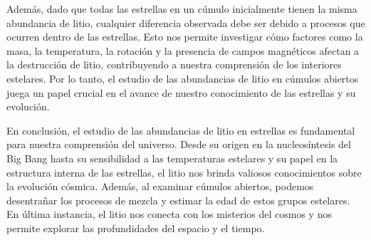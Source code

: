 Además, dado que todas las estrellas en un cúmulo inicialmente tienen la misma abundancia de litio, cualquier diferencia observada debe ser debido a procesos que ocurren dentro de las estrellas. Esto nos permite investigar cómo factores como la masa, la temperatura, la rotación y la presencia de campos magnéticos afectan a la destrucción de litio, contribuyendo a nuestra comprensión de los interiores estelares. Por lo tanto, el estudio de las abundancias de litio en cúmulos abiertos juega un papel crucial en el avance de nuestro conocimiento de las estrellas y su evolución.\par

En conclusión, el estudio de las abundancias de litio en estrellas es fundamental para nuestra comprensión del universo. Desde su origen en la nucleosíntesis del Big Bang hasta su sensibilidad a las temperaturas estelares y su papel en la estructura interna de las estrellas, el litio nos brinda valiosos conocimientos sobre la evolución cósmica. Además, al examinar cúmulos abiertos, podemos desentrañar los procesos de mezcla y estimar la edad de estos grupos estelares. En última instancia, el litio nos conecta con los misterios del cosmos y nos permite explorar las profundidades del espacio y el tiempo.\par

\endinput

